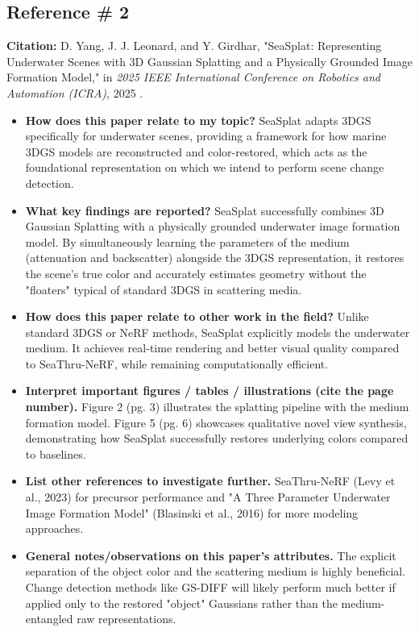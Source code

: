 \documentclass[12pt, a4paper]{article}
\begin{document}
\subsection*{Reference \# 2}
\textbf{Citation:} D. Yang, J. J. Leonard, and Y. Girdhar, "SeaSplat: Representing Underwater Scenes with 3D Gaussian Splatting and a Physically Grounded Image Formation Model," in \textit{2025 IEEE International Conference on Robotics and Automation (ICRA)}, 2025 \cite{11128502}.
\begin{itemize}
    \item \textbf{How does this paper relate to my topic?} SeaSplat adapts 3DGS specifically for underwater scenes, providing a framework for how marine 3DGS models are reconstructed and color-restored, which acts as the foundational representation on which we intend to perform scene change detection.
    \item \textbf{What key findings are reported?} SeaSplat successfully combines 3D Gaussian Splatting with a physically grounded underwater image formation model. By simultaneously learning the parameters of the medium (attenuation and backscatter) alongside the 3DGS representation, it restores the scene's true color and accurately estimates geometry without the "floaters" typical of standard 3DGS in scattering media.
    \item \textbf{How does this paper relate to other work in the field?} Unlike standard 3DGS or NeRF methods, SeaSplat explicitly models the underwater medium. It achieves real-time rendering and better visual quality compared to SeaThru-NeRF, while remaining computationally efficient.
    \item \textbf{Interpret important figures / tables / illustrations (cite the page number).} Figure 2 (pg. 3) illustrates the splatting pipeline with the medium formation model. Figure 5 (pg. 6) showcases qualitative novel view synthesis, demonstrating how SeaSplat successfully restores underlying colors compared to baselines.
    \item \textbf{List other references to investigate further.}  SeaThru-NeRF (Levy et al., 2023) for precursor performance and "A Three Parameter Underwater Image Formation Model" (Blasinski et al., 2016) for more modeling approaches.
    \item \textbf{General notes/observations on this paper’s attributes.} The explicit separation of the object color and the scattering medium is highly beneficial. Change detection methods like GS-DIFF will likely perform much better if applied only to the restored "object" Gaussians rather than the medium-entangled raw representations.
\end{itemize}
\end{document}
